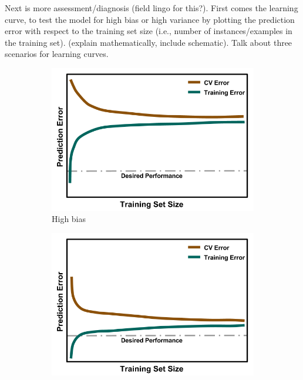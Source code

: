 Next is more assessment/diagnosis (field lingo for this?). First comes the
learning curve, to test the model for high bias or high variance by plotting
the prediction error with respect to the training set size (i.e., number of
instances/examples in the training set). (explain mathematically, include
schematic). Talk about three scenarios for learning curves. 

\begin{figure}[!hp]
  \begin{subfigure}[h]{0.65\linewidth}
    \centering
    \includegraphics[width=\linewidth]{./chapters/litrev/LearningCurve-bias.png}
    \caption{High bias}
    \label{fig:bias}
  \end{subfigure}
  \begin{subfigure}[h]{0.65\linewidth}
    \centering
    \includegraphics[width=\linewidth]{./chapters/litrev/LearningCurve-ideal.png}

\end{subfigure}
\end{figure}

